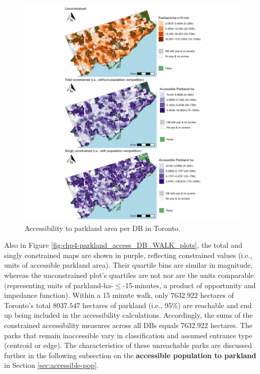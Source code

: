 \documentclass[
11pt, %
oneside, %
english, %
singlespacing, %
]{macthesis} %
\begin{document}
\begin{figure}

{\centering \includegraphics[width=6in]{./data/figures/chp4-parkland_access_DB_WALK_plots} 

}

\caption{\label{fig:chp4-parkland_access_DB_WALK_plots}Accessibility to parkland area per DB in Toronto.}\label{fig:unnamed-chunk-55}
\end{figure}

Also in Figure \ref{fig:chp4-parkland_access_DB_WALK_plots}, the total and singly constrained maps are shown in purple, reflecting constrained values (i.e., units of accessible parkland area). Their quartile bins are similar in magnitude, whereas the unconstrained plot's quartiles are not nor are the units comparable (representing units of parkland-ha-\(\le\)-15-minutes, a product of opportunity and impedance function). Within a 15 minute walk, only \(7632.922\) hectares of Toronto's total \(8037.547\) hectares of parkland (i.e., 95\%) are reachable and end up being included in the accessibility calculations. Accordingly, the sums of the constrained accessibility measures across all DBs equals 7632.922 hectares. The parks that remain inaccessible vary in classification and assumed entrance type (centroid or edge). The characteristics of these unreachable parks are discussed further in the following subsection on the \textbf{accessible population to parkland} in Section \ref{sec:accessible-pop}.
\end{document}
